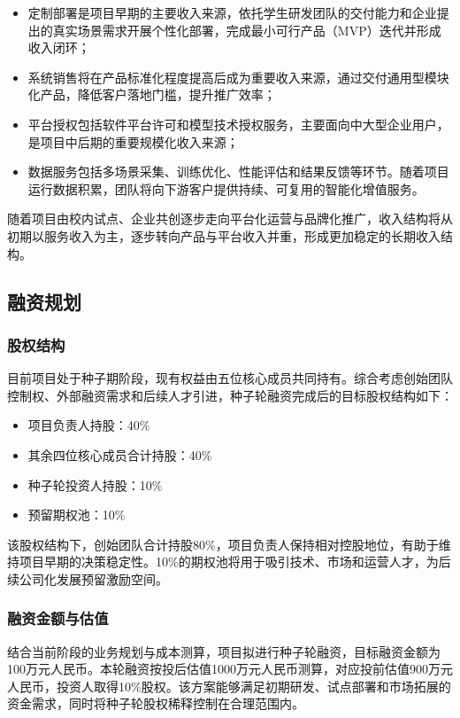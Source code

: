 \documentclass[zihao=-4]{ctexart}
\begin{document}
\begin{itemize}[leftmargin=2em]
  \item 定制部署是项目早期的主要收入来源，依托学生研发团队的交付能力和企业提出的真实场景需求开展个性化部署，完成最小可行产品（MVP）迭代并形成收入闭环；
  \item 系统销售将在产品标准化程度提高后成为重要收入来源，通过交付通用型模块化产品，降低客户落地门槛，提升推广效率；
  \item 平台授权包括软件平台许可和模型技术授权服务，主要面向中大型企业用户，是项目中后期的重要规模化收入来源；
  \item 数据服务包括多场景采集、训练优化、性能评估和结果反馈等环节。随着项目运行数据积累，团队将向下游客户提供持续、可复用的智能化增值服务。
\end{itemize}

随着项目由校内试点、企业共创逐步走向平台化运营与品牌化推广，收入结构将从初期以服务收入为主，逐步转向产品与平台收入并重，形成更加稳定的长期收入结构。

\subsection{融资规划}

\subsubsection{股权结构}

目前项目处于种子期阶段，现有权益由五位核心成员共同持有。综合考虑创始团队控制权、外部融资需求和后续人才引进，种子轮融资完成后的目标股权结构如下：

\begin{itemize}[leftmargin=2em]
  \item 项目负责人持股：40\%
  \item 其余四位核心成员合计持股：40\%
  \item 种子轮投资人持股：10\%
  \item 预留期权池：10\%
\end{itemize}

该股权结构下，创始团队合计持股80\%，项目负责人保持相对控股地位，有助于维持项目早期的决策稳定性。10\%的期权池将用于吸引技术、市场和运营人才，为后续公司化发展预留激励空间。

\subsubsection{融资金额与估值}

结合当前阶段的业务规划与成本测算，项目拟进行种子轮融资，目标融资金额为100万元人民币。本轮融资按投后估值1000万元人民币测算，对应投前估值900万元人民币，投资人取得10\%股权。该方案能够满足初期研发、试点部署和市场拓展的资金需求，同时将种子轮股权稀释控制在合理范围内。
\end{document}
